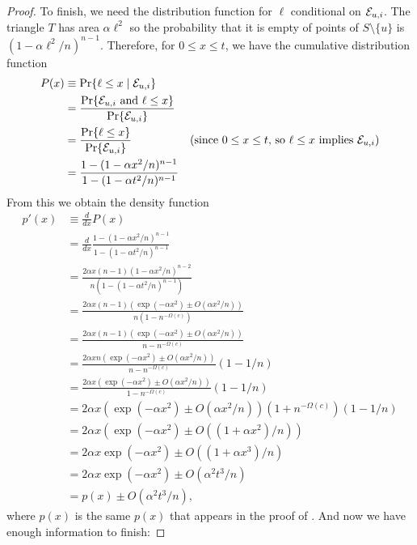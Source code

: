 \documentclass{patmorin}
\begin{document}
\begin{proof}
To finish, we need the distribution function for $\ell$ conditional on
$\mathcal{E}_{u,i}$.  The triangle $T$ has area $\alpha\ell^2$ so the probability that
it is empty of points of $S\setminus\{u\}$ is $(1-\alpha\ell^2/n)^{n-1}$.
Therefore, for $0\le x\le t$, we have the cumulative distribution function
\begin{align*}
   P(x) & \equiv \Pr\{\ell \le x\mid \mathcal{E}_{u,i}\}  \\
      & = \frac{\Pr\{\mathcal{E}_{u,i}\mbox{ and }\ell\le x\}}
               {\Pr\{\mathcal{E}_{u,i}\}} \\
      & = \frac{\Pr\{\ell\le x\}}  
               {\Pr\{\mathcal{E}_{u,i}\}} & \text{(since $0\le x\le t$, so $\ell \le x$ implies $\mathcal{E}_{u,i}$)} \\
      & = \frac{1-(1-\alpha x^2/n)^{n-1}}{1-(1-\alpha t^2/n)^{n-1}} 
\end{align*}
From this we obtain the density function
\begin{align*}
  p'(x) & \equiv \frac{d}{dx}P(x) \\
        & = \frac{d}{dx}
             \frac{1-(1-\alpha x^2/n)^{n-1}}{1-(1-\alpha t^2/n)^{n-1}} \\
        & = \frac{2\alpha x(n-1)(1-\alpha x^2/n)^{n-2}}
                  {n(1-(1-\alpha t^2/n)^{n-1})} \\
        & = \frac{2\alpha x(n-1)(\exp(-\alpha x^2)\pm O(\alpha x^2/n))}
                  {n(1-n^{-\Omega(c)})} \\
        & = \frac{2\alpha x(n-1)(\exp(-\alpha x^2)\pm O(\alpha x^2/n))}
                  {n-n^{-\Omega(c)}} \\
        & = \frac{2\alpha xn(\exp(-\alpha x^2)\pm O(\alpha x^2/n))}
                  {n-n^{-\Omega(c)}}(1-1/n) \\
        & = \frac{2\alpha x(\exp(-\alpha x^2)\pm O(\alpha x^2/n))}
                  {1-n^{-\Omega(c)}}(1-1/n) \\
        & = 2\alpha x\left(\exp(-\alpha x^2)\pm O(\alpha x^2/n)\right)
                  (1+n^{-\Omega(c)})(1-1/n) \\
        & = 2\alpha x\left(\exp(-\alpha x^2)\pm O((1+\alpha x^2)/n)\right) \\
        & = 2\alpha x\exp(-\alpha x^2)\pm O((1+\alpha x^3)/n) \\
        & = 2\alpha x\exp(-\alpha x^2)\pm O(\alpha^2 t^3/n) \\
        & = p(x)\pm O(\alpha^2 t^3/n) ,
\end{align*}
where $p(x)$ is the same $p(x)$ that appears in the proof of .
And now we have enough information to finish:

\end{proof}
\end{document}
